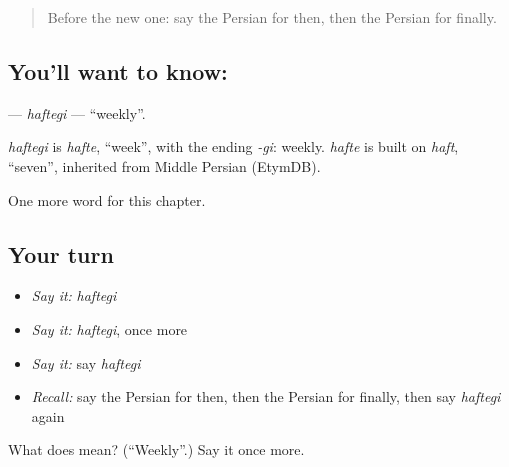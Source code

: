\label{lesson:FA-C153-haftegi}



\begin{quote}
Before the new one: say the Persian for then, then the Persian for finally.
\end{quote}

\subsection*{You'll want to know: }
\textbf{} — \emph{haftegi} — \textquotedblleft{}weekly\textquotedblright{}.

\begin{cousinweb}
\emph{haftegi} is \emph{hafte}, \textquotedblleft{}week\textquotedblright{}, with the ending \emph{-gi}: weekly. \emph{hafte} is built on \emph{haft}, \textquotedblleft{}seven\textquotedblright{}, inherited from Middle Persian (EtymDB).
\end{cousinweb}

\begin{grammarlens}[title={What you've built}]
One more word for this chapter.
\end{grammarlens}

\subsection*{Your turn}
\begin{itemize}
\raggedright
  \item \emph{Say it:} \emph{haftegi}
  \item \emph{Say it:} \emph{haftegi}, once more
  \item \emph{Say it:} say \emph{haftegi}
  \item \emph{Recall:} say the Persian for then, then the Persian for finally, then say \emph{haftegi} again
\end{itemize}

\begin{tcolorbox}[breakable,colback=teal!4,colframe=teal!35!black,title={Before you move on}]
What does  mean? (\textquotedblleft{}Weekly\textquotedblright{}.) Say it once more.
\end{tcolorbox}
